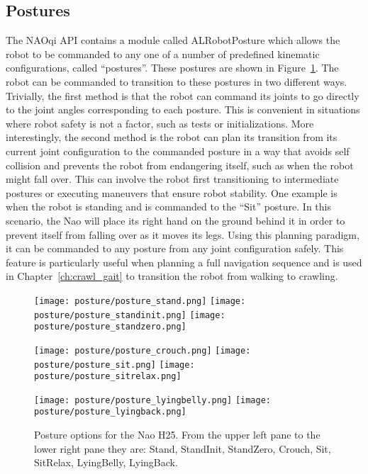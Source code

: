 \subsection{Postures}
The NAOqi API contains a module called ALRobotPosture which allows the robot
to be commanded to any one of a number of predefined kinematic configurations,
called ``postures''.
These postures are shown in Figure~\ref{fig:nao_postures1}.
The robot can be commanded to transition to these postures in two different ways.
Trivially, the first method is that the robot can command its joints to go 
directly to the joint angles corresponding to each posture. This is convenient
in situations where robot safety is not a factor, such as tests or initializations.
More interestingly, the second method is the robot can plan its transition
from its current joint configuration to the commanded posture in a way that
avoids self collision and prevents the robot from endangering itself, such
as when the robot might fall over. This can involve the robot first transitioning to intermediate
postures or executing maneuvers that ensure robot stability.
One example is when the robot is standing and is commanded to the ``Sit''
posture. In this scenario, the Nao will place its right hand on the ground
behind it in order to prevent itself from falling over as it moves its legs.
Using this planning paradigm, it can be commanded to any posture from any
joint configuration safely.
This feature is particularly useful when planning a full navigation sequence
and is used in Chapter~\ref{ch:crawl_gait} to transition the robot from 
walking to crawling.
\begin{figure}
\centerline{\texttt{[image: posture/posture\_stand.png]}
            \texttt{[image: posture/posture\_standinit.png]}
            \texttt{[image: posture/posture\_standzero.png]}
}
\vspace*{0.05in}
\centerline{\texttt{[image: posture/posture\_crouch.png]}
            \texttt{[image: posture/posture\_sit.png]}
            \texttt{[image: posture/posture\_sitrelax.png]}
}
\vspace*{0.05in}
\centerline{\texttt{[image: posture/posture\_lyingbelly.png]}
            \texttt{[image: posture/posture\_lyingback.png]}
}
\caption{Posture options for the Nao H25. From the upper left pane to the lower
         right pane they are: Stand, StandInit, StandZero, 
                              Crouch, Sit, SitRelax,
                              LyingBelly, LyingBack.}
\label{fig:nao_postures1}
\end{figure}
